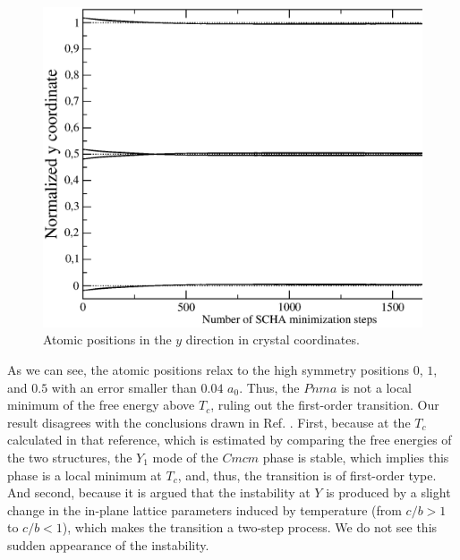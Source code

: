 \begin{figure}[h]
\begin{center}
\includegraphics[width=0.9\linewidth]{Figures/positions.eps}
\caption{Atomic positions in the $y$ direction in crystal coordinates.}
\label{atomic-relaxation}
\end{center}
\end{figure}
As we can see, the atomic positions relax to the high symmetry positions $0$, $1$, and $0.5$ with an error smaller than $0.04$ $a_{0}$. Thus, the $Pnma$ is not a local minimum of the free energy above $T_{c}$, ruling out the first-order transition. Our result disagrees with the conclusions drawn in Ref. \cite{dewandre2016two}.
First, because at the $T_{c}$ calculated in that reference, which is estimated by comparing the free energies of the two structures, the $Y_{1}$ mode of the $Cmcm$ phase is stable, which implies this phase is a local minimum 
at $T_{c}$, and, thus, the transition is of first-order type. And second, because it is argued that the instability at $Y$ is produced by a slight change in the in-plane lattice parameters induced by temperature
(from $c/b>1$ to $c/b<1$), which makes the transition a two-step process. We do not see this sudden appearance of the instability. \\


